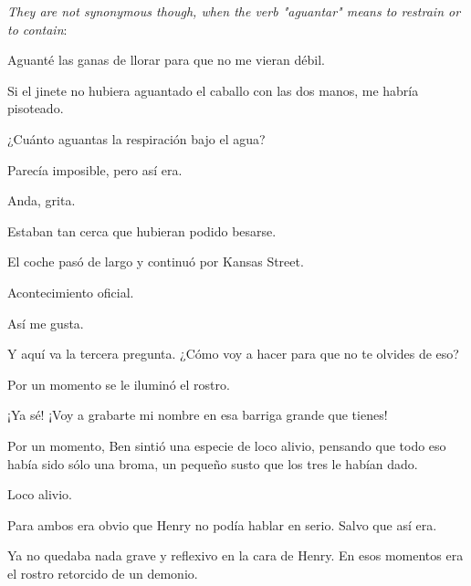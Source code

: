 \bsk
\textit{They are not synonymous though, when the verb "aguantar" means to restrain or to contain}:

\bsk
Aguanté las ganas de llorar para que no me vieran débil.

\sk
Si el jinete no hubiera aguantado el caballo con las dos manos, me habría pisoteado.

\sk
¿Cuánto aguantas la respiración bajo el agua?

\bsk
Parecía imposible, pero así era.

\sk
Anda, grita. 

\sk
Estaban tan cerca que hubieran podido besarse.

\sk
El coche pasó de largo y continuó por Kansas Street.

\sk
Acontecimiento oficial. 

\sk
Así me gusta. 

\sk
Y aquí va
la tercera pregunta. ¿Cómo voy a hacer para que
no te olvides de eso?

\sk
Por un momento se le iluminó el rostro.

\sk
¡Ya sé! ¡Voy a grabarte
mi nombre en esa barriga grande que tienes!

\sk
Por un momento, Ben sintió una especie de loco alivio,
pensando que todo eso había sido sólo una
broma, un pequeño susto que los tres le habían
dado.

\sk
Loco alivio. 

\sk
Para ambos era obvio que Henry no podía hablar en serio.
Salvo que así era.

\sk
Ya no quedaba nada grave y reflexivo en la
cara de Henry. En esos momentos era el rostro
retorcido de un demonio.

